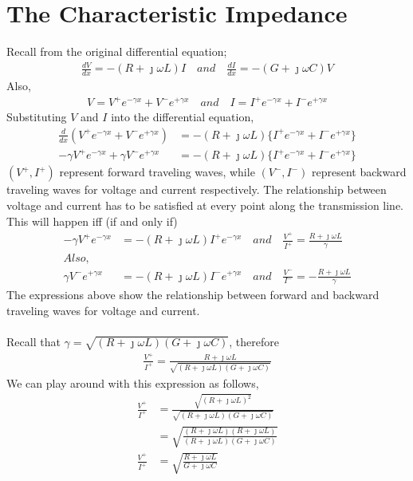\section{The Characteristic Impedance}
Recall from the original differential equation;
\begin{align*}
\frac{dV}{dx} = -(R+\jmath\omega L)I \quad and\quad \frac{dI}{dx} = -(G+\jmath\omega C)V
\end{align*}
Also, 
\begin{align*}
V = V^+e^{-\gamma x}+V^-e^{+\gamma x}\quad and \quad I = I^+e^{-\gamma x}+I^-e^{+\gamma x}
\end{align*}
Substituting $V$ and $I$ into the differential equation,
\begin{align*}
\frac{d}{dx}(V^+e^{-\gamma x}+V^-e^{+\gamma x}) &= -(R+\jmath\omega L)\{I^+e^{-\gamma x}+I^-e^{+\gamma x}\}\\
-\gamma V^+e^{-\gamma x}+\gamma V^-e^{+\gamma x} &= -(R+\jmath\omega L)\{I^+e^{-\gamma x}+I^-e^{+\gamma x}\}
\end{align*}
 $(V^+,I^+)$ represent forward traveling waves, while $(V^-,I^-)$ represent backward traveling waves for voltage and current respectively. The relationship between voltage and current has to be satisfied at every point along the transmission line. This will happen iff (if and only if)
\begin{align*}
-\gamma V^+e^{-\gamma x} &= -(R+\jmath\omega L)I^+e^{-\gamma x}\quad and\quad \frac{V^+}{I^+} = \frac{R+\jmath\omega L}{\gamma}\\
Also,    \ \ \ \ \                &\\
\gamma V^-e^{+\gamma x} &= -(R+\jmath\omega L)I^-e^{+\gamma x}\quad and\quad \frac{V^-}{I^-} = -\frac{R+\jmath\omega L}{\gamma}
\end{align*}
The expressions above show the relationship between forward and backward traveling waves for voltage and current.\\ \\
Recall that $\gamma = \sqrt{(R + \jmath\omega L)(G + \jmath\omega C)}$, therefore
\begin{align*}
\frac{V^+}{I^+} = \frac{R+\jmath\omega L}{\sqrt{(R + \jmath\omega L)(G + \jmath\omega C)}}
\end{align*}
We can play around with this expression as follows,
\begin{align*}
\frac{V^+}{I^+} &= \frac{\sqrt{(R+\jmath\omega L)^2}}{\sqrt{(R + \jmath\omega L)(G + \jmath\omega C)}}\\
&=\sqrt{\frac{(R+\jmath\omega L)(R+\jmath\omega L)}{(R + \jmath\omega L)(G + \jmath\omega C)}}\\
\frac{V^+}{I^+} &=\sqrt{\frac{R+\jmath\omega L}{G+\jmath\omega C}}
\end{align*}
